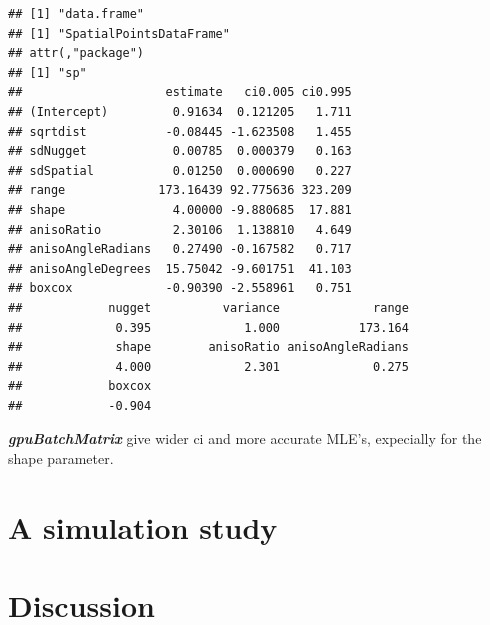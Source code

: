 \documentclass{article}\usepackage[]{graphicx}\usepackage[]{color}
\makeatletter
\newenvironment{kframe}{%
 \def\at@end@of@kframe{}%
 \ifinner\ifhmode%
  \def\at@end@of@kframe{\end{minipage}}%
  \begin{minipage}{\columnwidth}%
 \fi\fi%
 \def\FrameCommand##1{\hskip\@totalleftmargin \hskip-\fboxsep
 \colorbox{shadecolor}{##1}\hskip-\fboxsep
     \hskip-\linewidth \hskip-\@totalleftmargin \hskip\columnwidth}%
 \MakeFramed {\advance\hsize-\width
   \@totalleftmargin\z@ \linewidth\hsize
   \@setminipage}}%
 {\par\unskip\endMakeFramed%
 \at@end@of@kframe}
\newenvironment{knitrout}{}{} %
\newcommand{\pkg}[1]{\textbf{\emph{#1}}}
\makeatother
\begin{document}
\begin{knitrout}
\color{fgcolor}\begin{kframe}
\begin{verbatim}
## [1] "data.frame"
## [1] "SpatialPointsDataFrame"
## attr(,"package")
## [1] "sp"
##                    estimate   ci0.005 ci0.995
## (Intercept)         0.91634  0.121205   1.711
## sqrtdist           -0.08445 -1.623508   1.455
## sdNugget            0.00785  0.000379   0.163
## sdSpatial           0.01250  0.000690   0.227
## range             173.16439 92.775636 323.209
## shape               4.00000 -9.880685  17.881
## anisoRatio          2.30106  1.138810   4.649
## anisoAngleRadians   0.27490 -0.167582   0.717
## anisoAngleDegrees  15.75042 -9.601751  41.103
## boxcox             -0.90390 -2.558961   0.751
##            nugget          variance             range 
##             0.395             1.000           173.164 
##             shape        anisoRatio anisoAngleRadians 
##             4.000             2.301             0.275 
##            boxcox 
##            -0.904
\end{verbatim}
\end{kframe}
\end{knitrout}

\pkg{gpuBatchMatrix} give wider ci and more accurate MLE's, expecially for the shape parameter.

















\section{A simulation study}



\section{Discussion}










  
  
\end{document}
